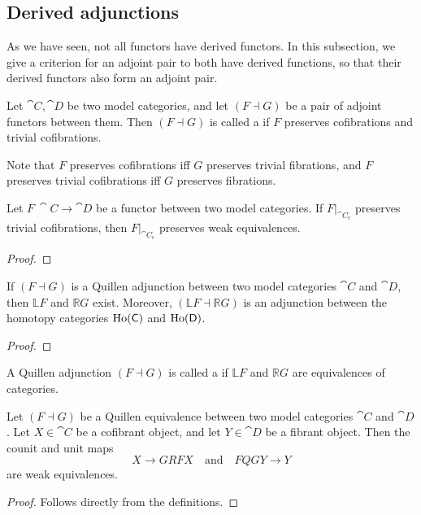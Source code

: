 \subsection{Derived adjunctions}

As we have seen, not all functors have derived functors.
In this subsection,
we give a criterion for an adjoint pair to both have derived functions,
so that their derived functors also form an adjoint pair.

\begin{definition}
    Let $\cat C,\cat D$ be two model categories,
    and let $(F\dashv G)$ be a pair of adjoint functors between them.
    Then $(F\dashv G)$ is called a 
    if $F$ preserves cofibrations and trivial cofibrations.
\end{definition}

Note that $F$ preserves cofibrations iff $G$ preserves trivial fibrations,
and $F$ preserves trivial cofibrations iff $G$ preserves fibrations.

\begin{lemma}
    Let $F\:\cat C\to\cat D$ be a functor between two model categories.
    If $F|_{\cat C_{\mathrm c}}$ preserves trivial cofibrations,
    then $F|_{\cat C_{\mathrm c}}$ preserves weak equivalences.
\end{lemma}

\begin{proof}
    \nyw
\end{proof}

\begin{corollary}
    If $(F\dashv G)$ is a Quillen adjunction
    between two model categories $\cat C$ and $\cat D$,
    then $\mathbb LF$ and $\mathbb RG$ exist.
    Moreover, $(\mathbb LF\dashv\mathbb RG)$
    is an adjunction between the homotopy categories $\operatorname{Ho}(\mathsf{C})$ and $\operatorname{Ho}(\mathsf{D})$.
\end{corollary}

\begin{proof}
    \nyw
\end{proof}

\begin{definition}
    A Quillen adjunction $(F\dashv G)$
    is called a  if
    $\mathbb LF$ and $\mathbb RG$ are equivalences of categories.
\end{definition}

\begin{proposition}\label{thm-2-z}
    Let $(F\dashv G)$ be a Quillen equivalence
    between two model categories $\cat C$ and $\cat D$.
    Let $X\in\cat C$ be a cofibrant object,
    and let $Y\in\cat D$ be a fibrant object.
    Then the counit and unit maps 
    \[ X\to G R F X\quad\text{and}\quad F Q G Y\to Y \]
    are weak equivalences.
\end{proposition}

\begin{proof}
    Follows directly from the definitions.
\end{proof}
